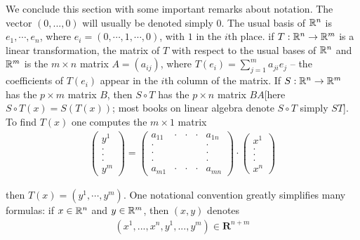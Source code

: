 We conclude this section with some important remarks
about notation. The vector $(0, . . . ,0)$ will usually be
denoted simply 0. The usual basis of $\mathbb{R}^n$ is $e_1, \cdots, e_n$, 
where $e_i = (0, \cdots, 1, \cdots, 0)$, with $1$ in the $i$th place.
if $T:\mathbb{R}^n \to \mathbb{R}^m$ is a linear transformation, the matrix of 
$T$ with respect to the usual bases of $\mathbb{R}^n$ and $\mathbb{R}^m$ is the 
$m\times n$ matrix $A = (a_{ij})$, where $T(e_i) = \sum_{j=1 }^{m }{a_{ji }e_j}$ 
-- the coefficients of $T(e_i)$ appear in the $i$th column of the matrix.
If $S:\mathbb{R}^n \to \mathbb{R}^m$ has the $p\times m$ matrix $B$, then $S\circ T$ has 
the $p\times n$ matrix $BA$[here $S\circ T(x) = S(T(x))$; most books on linear 
algebra denote $S\circ T$ simply $ST$].
To find $T(x)$ one computes the $m\times 1$ matrix
\begin{align*}
    \begin{pmatrix}
        y^1\\.\\.\\.\\y^m
    \end{pmatrix}
    =
    \begin{pmatrix}
        a_{11} & \cdot & \cdot & \cdot & a_{1n} \\
        \cdot  &       &       &       & \cdot \\
        \cdot  &       &       &       & \cdot \\
        \cdot  &       &       &       & \cdot \\
        a_{m1} & \cdot & \cdot & \cdot & a_{mn}
    \end{pmatrix}
    \cdot
    \begin{pmatrix}
        x^1\\.\\.\\.\\x^n
    \end{pmatrix}
\end{align*}  

then $T(x) = (y^1, \cdots, y^m)$. One notational convention greatly 
simplifies many formulas: if $x\in \mathbb{R}^n$ and $y\in \mathbb{R}^m$, then 
$(x, y)$ denotes 
\begin{align*}
    (x^1,...,x^n,y^1,...,y^m)\in\mathbf{R}^{n+m}
\end{align*}


